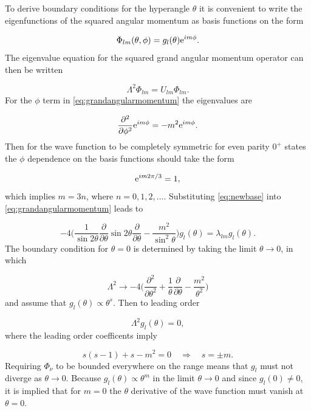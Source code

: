 To derive boundary conditions for the hyperangle $\theta$ it is convenient to write the eigenfunctions of the squared angular momentum as basis functions on the form

\begin{equation}\label{eq:newbase}
\Phi_{l m}(\theta,\phi) = g_{l}(\theta) \mathrm{e}^{ i m \phi}. 
\end{equation}
The eigenvalue equation for the squared grand angular momentum operator can then be written

\begin{equation}\label{eq:eigenlambda}
\Lambda^2 \Phi_{l m} = U_{lm}\Phi_{l m}.
\end{equation} 
For the $\phi$ term in \eqref{eq:grandangularmomentum} the eigenvalues are 

\begin{equation}
\frac{\partial^{2}}{\partial \phi^{2}} \mathrm{e}^{ i m \phi} = -m^{2} \mathrm{e}^{ i m \phi}.
\end{equation}
Then for the wave function to be completely symmetric for even parity $0^+$ states the $\phi$ dependence on the basis functions should take the form

\begin{equation}
\mathrm{e}^{ i m 2\pi/3} = 1,
\end{equation} 
which implies $m = 3n$, where $n=0,1,2,\ldots$. Substituting \eqref{eq:newbase} into  \eqref{eq:grandangularmomentum} leads to

\begin{equation}
 -4\Bigg(\frac{1}{\sin 2\theta} \frac{\partial}{\partial \theta} \sin 2\theta \frac{\partial}{\partial \theta} - \frac{m^{2}}{\sin^{2}\theta}\Bigg) g_{l}(\theta) = \lambda_{l m} g_{l}(\theta).
\end{equation}
The boundary condition for $\theta=0$ is determined by taking the limit $\theta \rightarrow 0$, in which  

\begin{equation}
\Lambda^{2} \rightarrow -4\Bigg(\frac{\partial^{2}}{\partial \theta^{2}} + \frac{1}{\theta} \frac{\partial}{\partial \theta} - \frac{m^{2}}{\theta^{2}}\Bigg)
\end{equation}
and assume that $g_l(\theta) \propto \theta^s$. Then to leading order 

\begin{equation}
\Lambda^{2} g_l(\theta) = 0,  
\end{equation}
where the leading order coefficents imply

\begin{equation}
s(s-1)+s-m^2 = 0 \quad \Rightarrow \quad s=\pm m.
\end{equation}
Requiring $\Phi_{\nu}$ to be bounded everywhere on the range means that $g_l$ must not diverge as $\theta \rightarrow 0$. Because $g_l(\theta) \propto \theta^m$ in the limit $\theta \rightarrow 0$ and since $g_l(0) \neq 0$, it is implied that for $m = 0$ the $\theta$ derivative of the wave function must vanish at $\theta=0$. 


